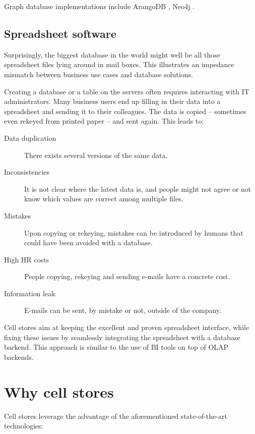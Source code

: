 \documentclass{acm_proc_article-sp}
\begin{document}
Graph database implementations include ArangoDB \cite{ArangoDB}, Neo4j \cite{Neo4j}.

\subsection{Spreadsheet software}

Surprisingly, the biggest database in the world might well be all those spreadsheet files lying around in mail boxes. This illustrates an impedance mismatch between business use cases and database solutions.

Creating a database or a table on the servers often requires interacting with IT administrators. Many business users end up filling in their data into a spreadsheet and sending it to their colleagues. The data is copied -- sometimes even rekeyed from printed paper -- and sent again. This leads to:

\vspace{-\topsep}
\begin{description}
\item[Data duplication] There exists several versions of the same data.
\item [Inconsistencies] It is not clear where the latest data is, and people might not agree or not know which values are correct among multiple files.
\item[Mistakes] Upon copying or rekeying, mistakes can be introduced by humans that could have been avoided with a database.
\item[High HR costs] People copying, rekeying and sending e-mails have a concrete cost.
\item[Information leak] E-mails can be sent, by mistake or not, outside of the company.
\end{description}

Cell stores aim at keeping the excellent and proven spreadsheet interface, while fixing these issues by seamlessly integrating the spreadsheet with a database backend. This approach is similar to the use of BI tools on top of OLAP backends.

\section{Why cell stores}
\label{section-why}

Cell stores leverage the advantage of the aforementioned state-of-the-art technologies:
\end{document}
